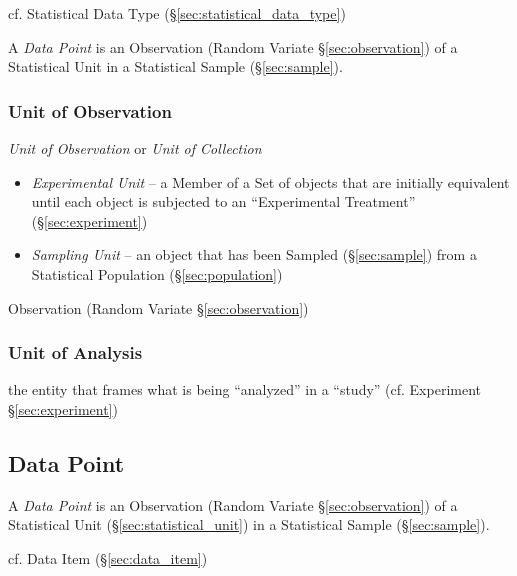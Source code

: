 cf. Statistical Data Type (\S\ref{sec:statistical_data_type})

\fist A \emph{Data Point} is an Observation (Random Variate
\S\ref{sec:observation}) of a Statistical Unit in a Statistical Sample
(\S\ref{sec:sample}).



\subsubsection{Unit of Observation}\label{sec:observational_unit}

\emph{Unit of Observation} or \emph{Unit of Collection}

\begin{itemize}
  \item \emph{Experimental Unit} -- a Member of a Set of objects that are
    initially equivalent until each object is subjected to an ``Experimental
    Treatment'' (\S\ref{sec:experiment})
  \item \emph{Sampling Unit} -- an object that has been Sampled
    (\S\ref{sec:sample}) from a Statistical Population (\S\ref{sec:population})
\end{itemize}

\fist Observation (Random Variate \S\ref{sec:observation})



\subsubsection{Unit of Analysis}\label{sec:analysis_unit}

the entity that frames what is being ``analyzed'' in a ``study'' (cf. Experiment
\S\ref{sec:experiment})



\subsection{Data Point}\label{sec:data_point}

A \emph{Data Point} is an Observation (Random Variate \S\ref{sec:observation})
of a Statistical Unit (\S\ref{sec:statistical_unit}) in a Statistical Sample
(\S\ref{sec:sample}).

cf. Data Item (\S\ref{sec:data_item})



